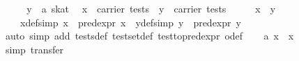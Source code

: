 \begin{isabellebody}
\isamarkupfalse%
\ {}\isanewline
\ \ \isamarkupfalse%
\ y\ {}{}\ {}{}a\ skat{}\ \isamarkupfalse%
\ {}x\ {}\ carrier\ tests{}\ \ {}y\ {}\ carrier\ tests{}\isanewline
\ \ \isamarkupfalse%
\ \isamarkupfalse%
\ x{}\ \ y{}\ \isanewline
\ \ \ \ x{}{}def{}simp{}{}\ {}x\ {}\ pred{}expr\ x{}{}\ \ y{}{}def{}simp{}{}\ {}y\ {}\ pred{}expr\ y{}{}\isanewline
\ \ \ \ \isamarkupfalse%
\ {}auto\ simp\ add{}\ tests{}def\ test{}set{}def\ test{}to{}pred{}expr\ o{}def{}\isanewline
\ \ \isamarkupfalse%
\ a{}\ {}x\ {}\ {}x\ {}\ {}{}\isanewline
\ \ \isamarkupfalse%
\ {}simp{}\ transfer{}\isanewline

\end{isabellebody}
